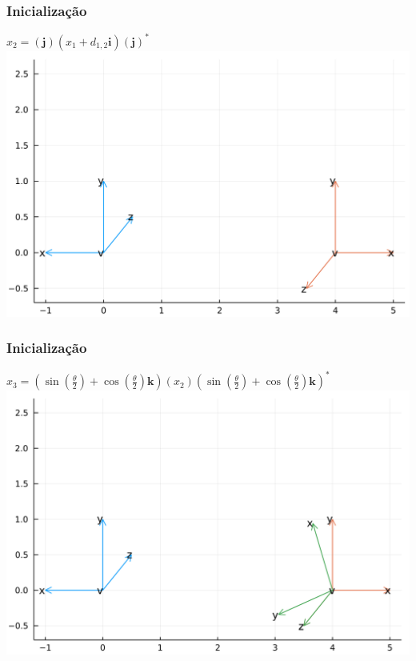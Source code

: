 \documentclass[10pt]{beamer}
\theoremstyle{plain}
\theoremstyle{definition}
\begin{document}
	\begin{frame}
		\frametitle{\normalsize Inicialização} 
		{
			\begin{center}
				$x_2 = (\mathbf j)(x_1 + d_{1,2}\mathbf i)(\mathbf j)^*$
				\\
				
				\vspace{0.5cm}
				\includegraphics[width=0.8\linewidth]{3.png}
			\end{center}
		}	
	\end{frame}

	\begin{frame}
		\frametitle{\normalsize Inicialização} 
		{
			\begin{center}
				$x_3 = (\sin(\frac \theta 2) + \cos(\frac \theta 2)\mathbf k)(x_2)(\sin(\frac \theta 2) + \cos(\frac \theta 2)\mathbf k)^*$
				\\
				
				\vspace{0.5cm}
				\includegraphics[width=0.8\linewidth]{4.png}
			\end{center}
		}	
	\end{frame}
\end{document}
